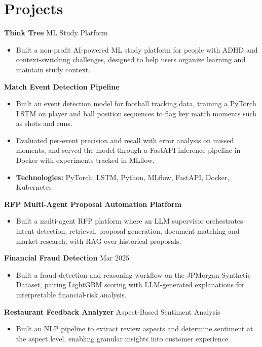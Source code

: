\documentclass[10pt,a4paper]{article}
\begin{document}
\section{Projects}
\textbf{Think Tree} \textbar{} ML Study Platform\par
\begin{itemize}
  \item Built a non-profit AI-powered ML study platform for people with ADHD and context-switching challenges, designed to help users organize learning and maintain study context.
\end{itemize}
\textbf{Match Event Detection Pipeline}\par
\begin{itemize}
  \item Built an event detection model for football tracking data, training a PyTorch LSTM on player and ball position sequences to flag key match moments such as shots and runs.
  \item Evaluated per-event precision and recall with error analysis on missed moments, and served the model through a FastAPI inference pipeline in Docker with experiments tracked in MLflow.
  \item \textbf{Technologies:} PyTorch, LSTM, Python, MLflow, FastAPI, Docker, Kubernetes
\end{itemize}
\textbf{RFP Multi-Agent Proposal Automation Platform}\par
\begin{itemize}
  \item Built a multi-agent RFP platform where an LLM supervisor orchestrates intent detection, retrieval, proposal generation, document matching and market research, with RAG over historical proposals.
\end{itemize}
\textbf{Financial Fraud Detection} \textbar{} Mar 2025\par
\begin{itemize}
  \item Built a fraud detection and reasoning workflow on the JPMorgan Synthetic Dataset, pairing LightGBM scoring with LLM-generated explanations for interpretable financial-risk analysis.
\end{itemize}
\textbf{Restaurant Feedback Analyzer} \textbar{} Aspect-Based Sentiment Analysis\par
\begin{itemize}
  \item Built an NLP pipeline to extract review aspects and determine sentiment at the aspect level, enabling granular insights into customer experience.
\end{itemize}
\end{document}
